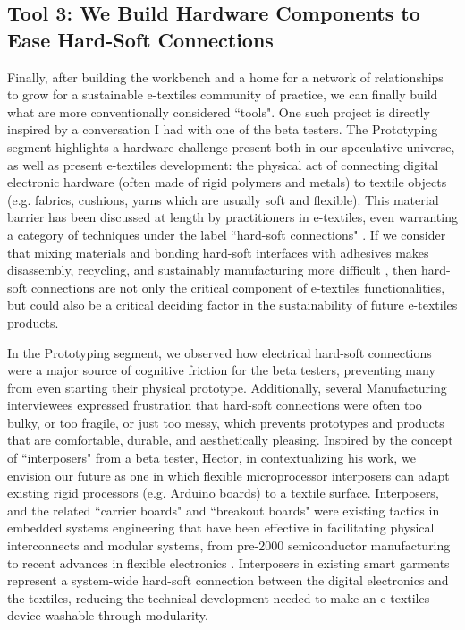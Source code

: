 \subsection{Tool 3: We Build Hardware Components to Ease Hard-Soft Connections}
Finally, after building the workbench and a home for a network of relationships to grow for a sustainable e-textiles community of practice, we can finally build what are more conventionally considered ``tools". One such project is directly inspired by a conversation I had with one of the beta testers. The Prototyping segment highlights a hardware challenge present both in our speculative universe, as well as present e-textiles development: the physical act of connecting digital electronic hardware (often made of rigid polymers and metals) to textile objects (e.g. fabrics, cushions, yarns which are usually soft and flexible). This material barrier has been discussed at length by practitioners in e-textiles, even warranting a category of techniques under the label ``hard-soft connections" \cite{kobakant_hardsoft_nodate}.
If we consider that mixing materials and bonding hard-soft interfaces with adhesives makes disassembly, recycling, and sustainably manufacturing more difficult \cite{soh_design_2014, battaia_reverse_2015}
, then hard-soft connections are not only the critical component of e-textiles functionalities, but could also be a critical deciding factor in the sustainability of future e-textiles products.

In the Prototyping segment, we observed how electrical hard-soft connections were a major source of cognitive friction for the beta testers, preventing many from even starting their physical prototype. Additionally, several Manufacturing interviewees expressed frustration that hard-soft connections were often too bulky, or too fragile, or just too messy, which prevents prototypes and products that are comfortable, durable, and aesthetically pleasing.
Inspired by the concept of ``interposers" from a beta tester, Hector, in contextualizing his work, we envision our future as one in which flexible microprocessor interposers can adapt existing rigid processors (e.g. Arduino boards) to a textile surface. Interposers, and the related ``carrier boards" and ``breakout boards" were existing tactics in embedded systems engineering that have been effective in facilitating physical interconnects and modular systems, from pre-2000 semiconductor manufacturing \cite{semiconductor_khandros_1992} to recent advances in flexible electronics \cite{souriau_wafer_2019, vervust_integration_2012}. Interposers in existing smart garments represent a system-wide hard-soft connection between the digital electronics and the textiles, reducing the technical development needed to make an e-textiles device washable through modularity. 

